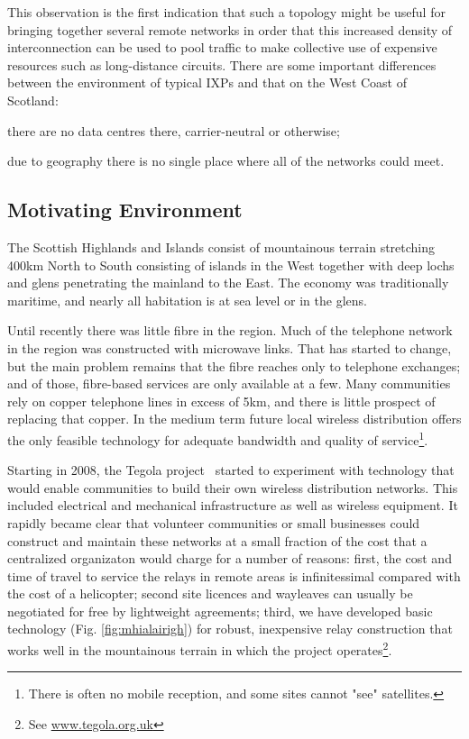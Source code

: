 This
observation is the first indication that such a topology might be
useful for bringing together several remote networks in order that
this increased density of interconnection can be used to pool traffic
to make collective use of expensive resources such as long-distance
circuits. There are some important differences between the environment
of typical \acp{IXP} and that on the West Coast of Scotland:
\begin{inparaenum}[(i)]
  \item there are no data centres there, carrier-neutral or otherwise;
  \item due to geography there is no single place where all of the
    networks could meet.
\end{inparaenum}



\subsection{Motivating Environment}
The Scottish Highlands and Islands consist of mountainous terrain
stretching 400km North to South consisting of islands in the West
together with deep lochs and glens penetrating the mainland to the
East.  The economy was traditionally maritime, and nearly all
habitation is at sea level or in the glens.

Until recently there was little fibre in the region.  Much of the
telephone network in the region was constructed with microwave
links. That has started to change, but the main problem remains that
the fibre reaches only to telephone exchanges; and of those,
fibre-based services are only available at a few.  Many communities
rely on copper telephone lines in excess of 5km, and there is little
prospect of replacing that copper.  In the medium term future local
wireless distribution offers the only feasible technology for adequate
bandwidth and quality of service\footnote{There is often no mobile
  reception, and some sites cannot "see" satellites.}.

Starting in 2008, the Tegola project~\cite{tegola} started to
experiment with technology that would enable communities to build
their own wireless distribution networks.  This included electrical
and mechanical infrastructure as well as wireless equipment.  It
rapidly became clear that volunteer communities or small businesses
could construct and maintain these networks at a small fraction of the
cost that a centralized organizaton would charge for a number of
reasons: first, the cost and time of travel to service the relays in
remote areas is infinitessimal compared with the cost of a helicopter;
second site licences and wayleaves can usually be negotiated for free
by lightweight agreements; third, we have developed basic technology
(Fig. \ref{fig:mhialairigh}) for robust, inexpensive relay
construction that works well in the mountainous terrain in which the
project operates\footnote{See \url{www.tegola.org.uk}}.

